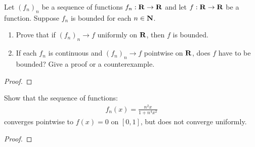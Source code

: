 \documentclass[11pt,twoside,openany]{memoir}
\begin{document}
\newpage
\fancyhead[L]{\scalebox{0.9}{Continuity}}
\fancyhead[R]{\scalebox{0.9}{Appeared on: S20}}
\begin{problem}
    Let $(f_n)_n$ be a sequence of functions $f_n:\mathbf{R} \rightarrow \mathbf{R}$ and let $f:\mathbf{R} \rightarrow \mathbf{R}$ be a function. Suppose $f_n$ is bounded for each $n \in \mathbf{N}$.
    \begin{enumerate}[label = (\arabic*)]
        \item Prove that if $(f_n)_n \rightarrow f$ uniformly on $\mathbf{R}$, then $f$ is bounded.
        \item If each $f_n$ is continuous and $(f_n)_n \rightarrow f$ pointwise on $\mathbf{R}$, does $f$ have to be bounded? Give a proof or a counterexample.
    \end{enumerate}
\end{problem}
\begin{proof}
\end{proof}

\newpage
\fancyhead[L]{\scalebox{0.9}{Continuity}}
\fancyhead[R]{\scalebox{0.9}{Appeared on: F19}}
\begin{problem}
    Show that the sequence of functions:
        \begin{equation*}
        \begin{split}
            f_n(x) = \frac{n^2 x}{1 + n^4 x^2}
        \end{split}
        \end{equation*}
    converges pointwise to $f(x) = 0$ on $[0,1]$, but does not converge uniformly.
\end{problem}
\begin{proof}
\end{proof}
\end{document}
